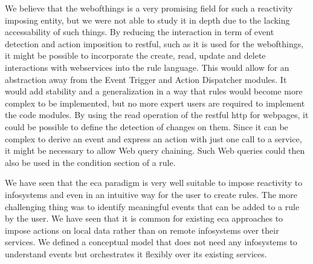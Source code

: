 We believe that the \textrm{\gls{webofthings}} is a very promising field for such a reactivity imposing entity, but we were not able to study it in depth due to the lacking accessability of such things.
By reducing the interaction in term of event detection and action imposition to \textrm{\acrshort{rest}ful}, such as it is used for the \textrm{\gls{webofthings}}, it might be possible to incorporate the create, read, update and delete interactions with \textrm{\glspl{webservice}} into the rule language.
This would allow for an abstraction away from the \textrm{Event Trigger} and \textrm{Action Dispatcher} modules.
It would add stability and a generalization in a way that rules would become more complex to be implemented, but no more expert users are required to implement the code modules.
By using the read operation of the \textrm{\acrshort{rest}ful} \textrm{\acrshort{http}} for webpages, it could be possible to define the detection of changes on them.
Since it can be complex to derive an event and express an action with just one call to a service, it might be necessary to allow Web query chaining.
Such Web queries could then also be used in the condition section of a rule.

We have seen that the \textrm{\acrshort{eca}} paradigm is very well suitable to impose reactivity to \textrm{\glspl{infosystem}} and even in an intuitive way for the user to create rules.
The more challenging thing was to identify meaningful events that can be added to a rule by the user.
We have seen that it is common for existing \textrm{\acrshort{eca}} approaches to impose actions on local data rather than on remote \textrm{\glspl{infosystem}} over their services.
We defined a conceptual model that does not need any \textrm{\glspl{infosystem}} to understand events but orchestrates it flexibly over its existing services.



